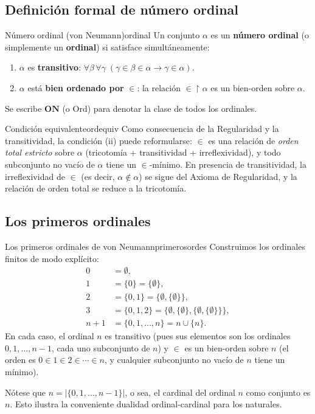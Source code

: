 \subsection{Definición formal de número ordinal}

\begin{definicion}{Número ordinal (von Neumann)}{ordinal}
Un conjunto $\alpha$ es un \textbf{número ordinal} (o simplemente un \textbf{ordinal}) si satisface simultáneamente:
\begin{enumerate}[leftmargin=2em, label=(\roman*)]
  \item $\alpha$ es \textbf{transitivo}: $\forall\beta\,\forall\gamma\;(\gamma \in \beta \in \alpha \to \gamma \in \alpha)$.
  \item $\alpha$ está \textbf{bien ordenado por} $\in$: la relación $\in \upharpoonright \alpha$ es un bien-orden sobre $\alpha$.
\end{enumerate}
Se escribe $\mathbf{ON}$ (o $\mathrm{Ord}$) para denotar la clase de todos los ordinales.
\end{definicion}

\begin{observacion}{Condición equivalente}{ordequiv}
Como consecuencia de la Regularidad y la transitividad, la condición (ii) puede reformularse: $\in$ es una relación de \emph{orden total estricto} sobre $\alpha$ (tricotomía + transitividad + irreflexividad), y todo subconjunto no vacío de $\alpha$ tiene un $\in$-mínimo. En presencia de transitividad, la irreflexividad de $\in$ (es decir, $\alpha \notin \alpha$) se sigue del Axioma de Regularidad, y la relación de orden total se reduce a la tricotomía.
\end{observacion}

\subsection{Los primeros ordinales}

\begin{ejemplo}{Los primeros ordinales de von Neumann}{primerosordes}
Construimos los ordinales finitos de modo explícito:
\begin{align*}
  0 &= \emptyset,\\
  1 &= \{0\} = \{\emptyset\},\\
  2 &= \{0,1\} = \{\emptyset,\{\emptyset\}\},\\
  3 &= \{0,1,2\} = \{\emptyset,\{\emptyset\},\{\emptyset,\{\emptyset\}\}\},\\
  n+1 &= \{0,1,\ldots,n\} = n \cup \{n\}.
\end{align*}
En cada caso, el ordinal $n$ es transitivo (pues sus elementos son los ordinales $0, 1, \ldots, n-1$, cada uno subconjunto de $n$) y $\in$ es un bien-orden sobre $n$ (el orden es $0 \in 1 \in 2 \in \cdots \in n$, y cualquier subconjunto no vacío de $n$ tiene un mínimo).

Nótese que $n = |\{0, 1, \ldots, n-1\}|$, o sea, el cardinal del ordinal $n$ como conjunto es $n$. Esto ilustra la conveniente dualidad ordinal-cardinal para los naturales.
\end{ejemplo}

